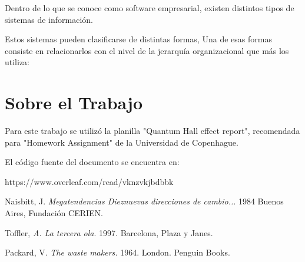 \documentclass[a4paper, 12pt]{article}
\begin{document}
Dentro de lo que se conoce como software empresarial, existen distintos tipos de sistemas de información.

Estos sistemas pueden clasificarse de distintas formas, Una de esas formas consiste en relacionarlos con el nivel de la jerarquía organizacional que más los utiliza:



\section{Sobre el Trabajo}
Para este trabajo se utilizó la planilla "Quantum Hall effect report", recomendada para "Homework Assignment" de la Universidad de Copenhague.

El código fuente del documento se encuentra en:

https://www.overleaf.com/read/vknzvkjbdbbk

\begin{thebibliography}{9}

Naisbitt, J. \emph{Megatendencias Dieznuevas direcciones de cambio..}. 1984 Buenos Aires, Fundación CERIEN.

Toffler, \emph{A. La tercera ola}. 1997. Barcelona, Plaza y Janes. 


Packard, V. \emph{The waste makers.} 1964. London. Penguin Books.

\end{thebibliography}
\end{document}
